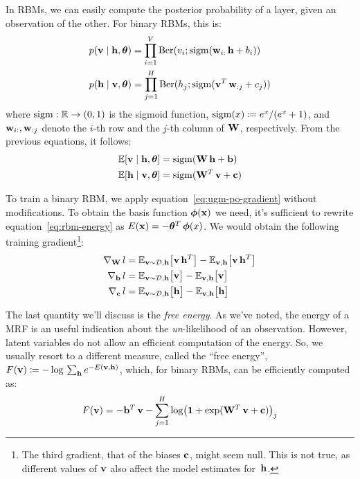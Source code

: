 In RBMs, we can easily compute the posterior probability of a layer, given an
observation of the other. For binary RBMs, this is:
\begin{equation}
	\begin{aligned}
		p(\mathbf{v} \mid \mathbf{h}, \bm{\theta}) &= \prod_{i=1}^V \operatorname{Ber}(v_i;
		\operatorname{sigm}(\mathbf{w}_{i:}\, \mathbf{h} + b_i)) \\
		p(\mathbf{h} \mid \mathbf{v}, \bm{\theta}) &= \prod_{j=1}^H \operatorname{Ber}(h_j;
		\operatorname{sigm}(\mathbf{v}^T\, \mathbf{w}_{:j} + c_j))
	\end{aligned}
	\label{eq:rbm-conditionals}
\end{equation}
where $\operatorname{sigm}: \mathbb{R} \to (0, 1)$ is the sigmoid function, $\operatorname{sigm}(x) \coloneqq
e^x/(e^x+1)$, and $\mathbf{w}_{i:}, \mathbf{w}_{:j}$ denote the $i$-th row and the
$j$-th column of $\mathbf{W}$, respectively.  From the previous equations, it
follows:
\begin{equation}
	\begin{aligned}
		\mathbb{E}[\mathbf{v}\mid \mathbf{h},\bm{\theta}] &= \operatorname{sigm}(\mathbf{W}\, \mathbf{h} + \mathbf{b}) \\
		\mathbb{E}[\mathbf{h}\mid \mathbf{v},\bm{\theta}] &= \operatorname{sigm}(\mathbf{W}^T\, \mathbf{v} + \mathbf{c})
	\end{aligned}
	\label{eq:rbm-expectations}
\end{equation}

To train a binary RBM, we apply equation~\eqref{eq:ugm-po-gradient} without
modifications. To obtain the basis function $\bm{\phi}(\mathbf{x})$ we need, it's
sufficient to rewrite equation~\eqref{eq:rbm-energy} as $E(\mathbf{x}) = -\bm{\theta}^T\,
\bm{\phi}(x)$. We would obtain the following training gradient\footnote{The
third gradient, that of the biases $\mathbf{c}$, might seem null. This is not
true, as different values of $\mathbf{v}$ also affect the model estimates
for~$\mathbf{h}$.}:
\begin{equation}
	\begin{aligned}
		\nabla_{\mathbf{W}}\,l &=
			\mathbb{E}_{\mathbf{v} \sim \mathcal{D},\mathbf{h}} \bigl[ \mathbf{v}\, \mathbf{h}^T \bigr] -
			\mathbb{E}_{\mathbf{v},\mathbf{h}} \bigl[ \mathbf{v}\, \mathbf{h}^T \bigr] \\
		\nabla_{\mathbf{b}}\,l &=
			\mathbb{E}_{\mathbf{v} \sim \mathcal{D},\mathbf{h}} \bigl[ \mathbf{v} \bigr] -
			\mathbb{E}_{\mathbf{v},\mathbf{h}} \bigl[ \mathbf{v} \bigr] \\
		\nabla_{\mathbf{c}}\,l &=
			\mathbb{E}_{\mathbf{v} \sim \mathcal{D},\mathbf{h}} \bigl[ \mathbf{h} \bigr] -
			\mathbb{E}_{\mathbf{v},\mathbf{h}} \bigl[ \mathbf{h} \bigr]
	\end{aligned}
	\label{eq:rbm-gradients}
\end{equation}

The last quantity we'll discuss is the \emph{free energy}. As we've noted, the
energy of a MRF is an useful indication about the \emph{un}-likelihood of an
observation. However, latent variables do not allow an efficient computation
of the energy. So, we usually resort to a different measure, called the ``free
energy'', $F(\mathbf{v}) \coloneqq - \log\, \sum_{\mathbf{h}} e^{-E(\mathbf{v}, \mathbf{h})}$, which, for
binary RBMs, can be efficiently computed as:
\begin{equation}
	F(\mathbf{v}) = - \mathbf{b}^T\, \mathbf{v} - \sum_{j=1}^H \log
		\bigl(\mathbf{1} + \exp(\mathbf{W}^T\, \mathbf{v} + \mathbf{c}) \bigr)_j
	\label{eq:free-energy}
\end{equation}


